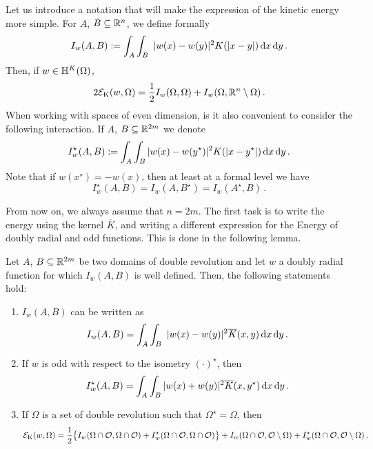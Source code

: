 Let us introduce a notation that will make the expression of the kinetic energy more simple. For $A$, $B\subseteq \mathbb{R}^n$, we define formally
$$
I_w(A,B) := \int_A  \int_B  \ |w(x)-w(y)|^2 K(|x-y|)  \,\mathrm{d} x \,\mathrm{d} y\,.
$$
Then, if $w \in \mathbb{H}^K(\Omega)$,
\begin{equation}
\label{Eq:EnergyWithInteractions}
2 \mathcal{E}_\mathrm{K}(w,\Omega) = \dfrac{1}{2}I_w(\Omega, \Omega) + I_w(\Omega,\mathbb{R}^n\setminus\Omega)\,.
\end{equation}
When working with spaces of even dimension, is it also convenient to consider the following interaction. If $A$, $B\subseteq \mathbb{R}^{2m}$ we denote
$$
I^\star_w(A,B) := \int_A \int_B |w(x)-w(y^\star)|^2 K(|x-y^\star|) \,\mathrm{d} x \,\mathrm{d} y\,.
$$
Note that if $w(x^\star) = - w(x)$, then at least at a formal level we have 
$$
I^\star_w(A,B) = I_w(A,B^\star) = I_w(A^\star,B)\,.
$$

From now on, we always assume that $n=2m$. The first task is to write the energy using the kernel $\overline{K}$, and writing a different expression for the Energy of doubly radial and odd functions. This is done in the following lemma.  


\begin{lemma}
\label{Lemma:InteractionsWithOverlineK}
Let $A$, $B\subseteq \mathbb{R}^{2m}$ be two domains of double revolution and let $w$ a doubly radial function for which $I_w(A,B)$ is well defined. Then, the following statements hold:
\begin{enumerate}
\item $I_w(A,B)$ can be written as
$$ 
I_w(A,B) = \int_A  \int_B  \ |w(x)-w(y)|^2 \overline{K}(x,y)  \,\mathrm{d} x \,\mathrm{d} y\,.
$$
\item If $w$ is odd with respect to the isometry $(\cdot)^\star$, then
$$
I^\star_w(A,B) = \int_A \int_B |w(x)+w(y)|^2 \overline{K}(x,y^\star) \,\mathrm{d} x \,\mathrm{d} y\,.
$$
\item If $\Omega$ is a set of double revolution such that $\Omega^\star = \Omega$, then
$$ 
\mathcal{E}_\mathrm{K}(w, \Omega) = \dfrac{1}{2} \big \{ I_w(\Omega\cap \mathcal{O}, \Omega\cap \mathcal{O}) + I^\star_w(\Omega\cap \mathcal{O}, \Omega\cap \mathcal{O}) \big \} + I_w(\Omega\cap \mathcal{O},\mathcal{O}\setminus\Omega)  + I^\star_w(\Omega\cap \mathcal{O},\mathcal{O}\setminus\Omega)\,. 
$$
\end{enumerate}
\end{lemma}


